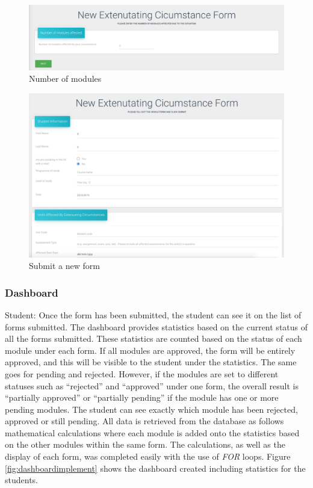 \documentclass[../main.tex]{subfiles}
\begin{document}
\begin{figure}[H]
        \includegraphics[scale=0.7]
        {images/units.png}
        \caption{\label{fig:units} Number of modules}
      \end{figure}

\begin{figure}[H]
        \includegraphics[scale=0.7]
        {images/newform.png}
        \caption{\label{fig:newform} Submit a new form}
      \end{figure}

\subsubsection{Dashboard} 
Student: Once the form has been submitted, the student can see it on the list of forms submitted. The dashboard provides statistics based on the current status of all the forms submitted. These statistics are counted based on the status of each module under each form. If all modules are approved, the form will be entirely approved, and this will be visible to the student under the statistics. The same goes for pending and rejected. However, if the modules are set to different statuses such as \enquote{rejected} and \enquote{approved} under one form, the overall result is \enquote{partially approved} or \enquote{partially pending} if the module has one or more pending modules. The student can see exactly which module has been rejected, approved or still pending.  All data is retrieved from the database as follows mathematical calculations where each module is added onto the statistics based on the other modules within the same form. The calculations, as well as the display of each form, was completed easily with the use of \textit{FOR} loops. Figure \ref{fig:dashboardimplement} shows the dashboard created including statistics for the students.\\[4mm] 
\end{document}
